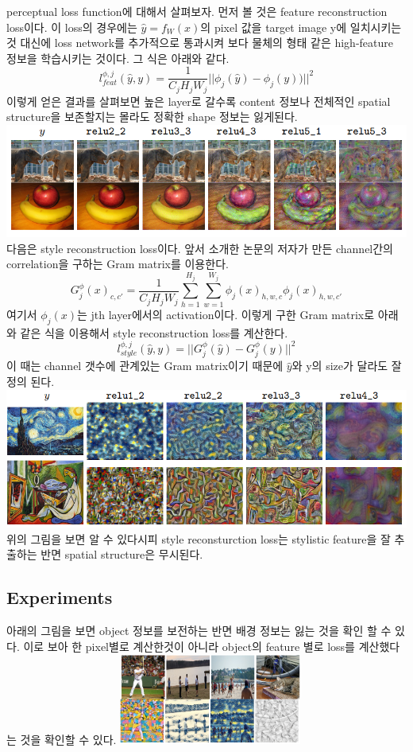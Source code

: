 \documentclass[extendedabs]{bmvc2k}
\begin{document}
  perceptual loss function에 대해서 살펴보자. 먼저 볼 것은 feature reconstruction loss이다. 이 loss의 경우에는 $\hat{y}=f_W(x)$의 pixel 값을 target image y에 일치시키는 것 대신에 
  loss network를 추가적으로 통과시켜 보다 물체의 형태 같은 high-feature 정보을 학습시키는 것이다. 그 식은 아래와 같다.  
  $$l_{feat}^{\phi,j}(\hat{y},y) = \frac{1}{C_jH_jW_j}||\phi_j(\hat{y})-\phi_j(y))||^2$$
  이렇게 얻은 결과를 살펴보면 높은 layer로 갈수록 content 정보나 전체적인 spatial structure을 보존할지는 몰라도 정확한 shape 정보는 잃게된다. 
  \newline  \includegraphics[width=\linewidth]{images/01_style.PNG}
  다음은 style reconstruction loss이다. 앞서 소개한 논문의 저자가 만든 channel간의 correlation을 구하는 Gram matrix를 이용한다. 
  $$G_j^{\phi}(x)_{c,c'} = \frac{1}{C_jH_jW_j}\sum_{h=1}^{H_j}\sum_{w=1}^{W_j}\phi_j(x)_{h,w,c}\phi_j(x)_{h,w,c'}$$
  여기서 $\phi_j(x)$는 jth layer에서의 activation이다. 이렇게 구한 Gram matrix로 아래와 같은 식을 이용해서 style reconstruction loss를 계산한다. 
  $$l_{style}^{\phi,j}(\hat{y},y) = ||G_j^{\phi}(\hat{y})-G_j^{\phi}(y)||^2$$ 
  이 때는 channel 갯수에 관계있는 Gram matrix이기 때문에 $\hat{y}$와 y의 size가 달라도 잘 정의 된다.
  \newline  \includegraphics[width=\linewidth]{images/02_style.PNG}
  위의 그림을 보면 알 수 있다시피 style reconsturction loss는 stylistic feature을 잘 추출하는 반면 spatial structure은 무시된다.
  
  \subsection{Experiments}
  \quad  아래의 그림을 보면 object 정보를 보전하는 반면 배경 정보는 잃는 것을 확인 할 수 있다. 이로 보아 한 pixel별로 계산한것이 아니라 object의 feature 별로 loss를 계산했다는 것을 확인할 수 있다.
  \newline  \includegraphics[width=6cm]{images/03_style.PNG}
\end{document}
